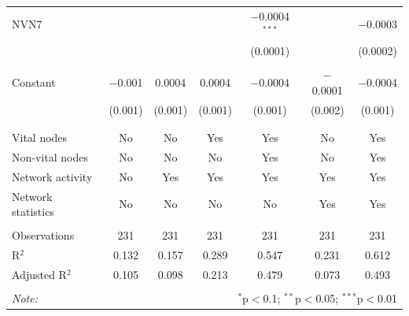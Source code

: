 \begin{table}[!htbp]
\begin{tabular}{@{\extracolsep{5pt}}lcccccc}
 NVN7 &  &  &  & $-$0.0004$^{***}$ &  & $-$0.0003 \\ 
  &  &  &  & (0.0001) &  & (0.0002) \\ 
  & & & & & & \\ 
 Constant & $-$0.001 & 0.0004 & 0.0004 & $-$0.0004 & $-$0.0001 & $-$0.0004 \\ 
  & (0.001) & (0.001) & (0.001) & (0.001) & (0.002) & (0.001) \\ 
  & & & & & & \\ 
\hline \\[-1.8ex] 
Vital nodes & No & No & Yes & Yes & No & Yes \\ 
Non-vital nodes & No & No & No & Yes & No & Yes \\ 
Network activity & No & Yes & Yes & Yes & Yes & Yes \\ 
Network statistics & No & No & No & No & Yes & Yes \\ 
\hline &  &  &  &  &  &  \\ 
Observations & 231 & 231 & 231 & 231 & 231 & 231 \\ 
R$^{2}$ & 0.132 & 0.157 & 0.289 & 0.547 & 0.231 & 0.612 \\ 
Adjusted R$^{2}$ & 0.105 & 0.098 & 0.213 & 0.479 & 0.073 & 0.493 \\ 
\hline 
\hline \\[-1.8ex] 
\textit{Note:}  & \multicolumn{6}{r}{$^{*}$p$<$0.1; $^{**}$p$<$0.05; $^{***}$p$<$0.01} \\ 
\end{tabular} 
\end{table} 
